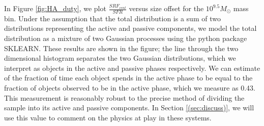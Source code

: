 \documentclass[iop]{emulateapj}
\begin{document}
In Figure \ref{fig:HA_duty}, we plot $\frac{SRF_{cent}}{SFR}$ versus size offset for the $10^{9.5} M_{\odot}$ mass bin. Under the assumption that the total distribution is a sum of two distributions representing the active and passive components, we model the total distribution as a mixture of two Gaussian processes using the python package SKLEARN. These results are shown in the figure; the line through the two dimensional histogram separates the two Gaussian distributions, which we interpret as objects in the active and passive phases respectively. We can estimate of the fraction of time each object spends in the active phase to be equal to the fraction of objects observed to be in the active phase, which we measure as 0.43. This measurement is reasonably robust to the precise method of dividing the sample into its active and passive components. In Section \ref{(sec:discuss)}, we will use this value to comment on the physics at play in these systems.

	

	
\end{document}
